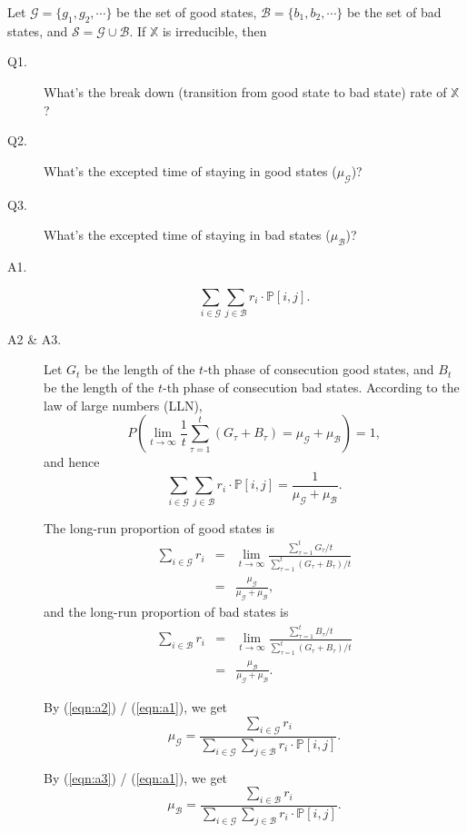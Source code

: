 \begin{example}
Let $ \mathcal{G} = \{ g_{1}, g_{2}, \cdots \} $ be the set of good states, $ \mathcal{B} = \{ b_{1}, b_{2}, \cdots \} $ be the set of bad states, and $ \mathcal{S} = \mathcal{G} \cup \mathcal{B} $. If $ \mathbb{X} $ is irreducible, then
\begin{description}
  \item[Q1.] What's the break down (transition from good state to bad state) rate of $ \mathbb{X} $?
  \item[Q2.] What's the excepted time of staying in good states ($ \mu_{\mathcal{G}} $)?
  \item[Q3.] What's the excepted time of staying in bad states ($ \mu_{\mathcal{B}} $)?
\end{description}

\begin{description}
  \item[A1.] \[ \sum_{i \in \mathcal{G}} \sum_{j \in \mathcal{B}} r_{i} \cdot \mathbb{P}[i, j]. \]
  \item[A2 \& A3.]
    Let $ G_{t} $ be the length of the $ t $-th phase of consecution good states, and $ B_{t} $ be the length of the $ t $-th phase of consecution bad states. According to the law of large numbers (LLN),
    \[ P \left( \lim_{t \to \infty} \frac{1}{t} \sum_{\tau = 1}^{t} (G_\tau + B_\tau) = \mu_{\mathcal{G}} + \mu_{\mathcal{B}} \right) = 1, \]
    and hence
    \begin{equation}
    \sum_{i \in \mathcal{G}} \sum_{j \in \mathcal{B}} r_{i} \cdot \mathbb{P}[i, j] = \frac{1}{\mu_{\mathcal{G}} + \mu_{\mathcal{B}}}. \label{eqn:a1}
    \end{equation}

    The long-run proportion of good states is
    \begin{eqnarray}
    \sum_{i \in \mathcal{G}} r_{i}
      & = & \lim_{t \to \infty} \frac{\sum_{\tau = 1}^{t} G_{\tau} / t}{\sum_{\tau = 1}^{t} (G_{\tau} + B_{\tau}) / t} \nonumber \\
      & = & \frac{\mu_{\mathcal{G}}}{\mu_{\mathcal{G}} + \mu_{\mathcal{B}}}, \label{eqn:a2}
    \end{eqnarray}
    and the long-run proportion of bad states is
    \begin{eqnarray}
    \sum_{i \in \mathcal{B}} r_{i}
      & = & \lim_{t \to \infty} \frac{\sum_{\tau = 1}^{t} B_{\tau} / t}{\sum_{\tau = 1}^{t} (G_{\tau} + B_{\tau}) / t} \nonumber \\
      & = & \frac{\mu_{\mathcal{B}}}{\mu_{\mathcal{G}} + \mu_{\mathcal{B}}}. \label{eqn:a3}
    \end{eqnarray}

    By (\ref{eqn:a2}) / (\ref{eqn:a1}), we get
    \[ \mu_{\mathcal{G}} = \frac{\sum_{i \in \mathcal{G}} r_{i}}{\sum_{i \in \mathcal{G}} \sum_{j \in \mathcal{B}} r_{i} \cdot \mathbb{P}[i, j]}. \]

    By (\ref{eqn:a3}) / (\ref{eqn:a1}), we get
    \[ \mu_{\mathcal{B}} = \frac{\sum_{i \in \mathcal{B}} r_{i}}{\sum_{i \in \mathcal{G}} \sum_{j \in \mathcal{B}} r_{i} \cdot \mathbb{P}[i, j]}. \]
\end{description}
\end{example}

